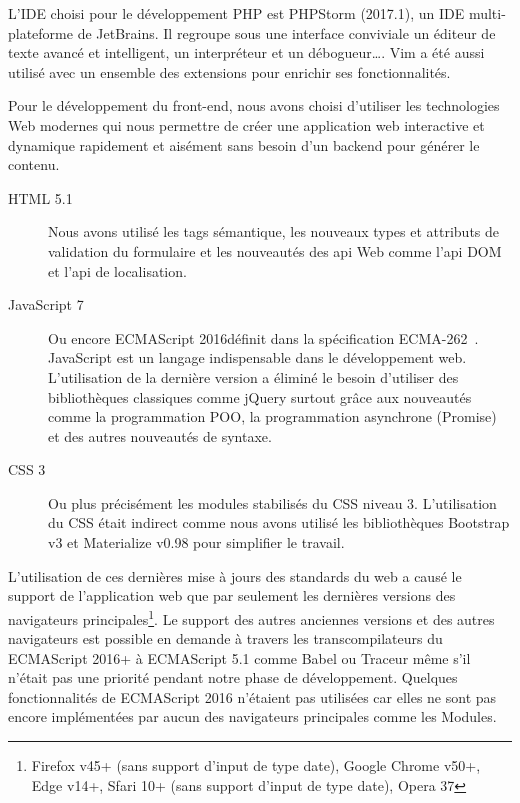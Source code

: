 L'IDE choisi pour le développement PHP est PHPStorm (2017.1), un IDE
multi-plateforme de JetBrains. Il regroupe sous une interface conviviale un
éditeur de texte avancé et intelligent, un interpréteur et un débogueur\ldots.
Vim a été aussi utilisé avec un ensemble des extensions pour enrichir ses
fonctionnalités.

Pour le développement du front-end, nous avons choisi d'utiliser les
technologies Web modernes qui nous permettre de créer une application web
interactive et dynamique rapidement et aisément sans besoin d'un backend pour
générer le contenu.

\begin{description}
    \item [HTML 5.1] Nous avons utilisé les tags sémantique, les nouveaux types
        et attributs de validation du formulaire et les nouveautés
        des api Web comme l'api DOM et l'api de localisation.
    \item [JavaScript 7] Ou encore ECMAScript 2016\textregistered définit dans
        la spécification ECMA-262~\cite{ECMA262}. JavaScript est un langage
        indispensable dans le développement web. L'utilisation de la dernière
        version a éliminé le besoin d'utiliser des bibliothèques classiques
        comme jQuery surtout grâce aux nouveautés comme la programmation POO,
        la programmation asynchrone (Promise) et des autres nouveautés de
        syntaxe.
    \item [CSS 3] Ou plus précisément les modules stabilisés du CSS niveau 3.
        L'utilisation du CSS était indirect comme nous avons
        utilisé les bibliothèques Bootstrap v3 et Materialize v0.98 pour
        simplifier le travail.
\end{description}

L'utilisation de ces dernières mise à jours des standards du web a causé le
support de l'application web que par seulement les dernières versions des
navigateurs principales\footnote{Firefox v45+ (sans support d'input de type
date), Google Chrome v50+, Edge v14+, Sfari 10+ (sans support d'input de type
date), Opera 37}. Le support des autres anciennes versions et des autres
navigateurs est possible en demande à travers les transcompilateurs du
ECMAScript 2016+ à ECMAScript 5.1 comme Babel ou Traceur même s'il n'était pas
une priorité pendant notre phase de développement. Quelques fonctionnalités de
ECMAScript 2016 n'étaient pas utilisées car elles ne sont pas encore
implémentées par aucun des navigateurs principales comme les Modules.

